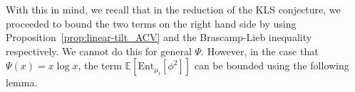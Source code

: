 
With this in mind, we recall that in the reduction of the KLS conjecture, we proceeded to bound the two terms on the 
right hand side by using Proposition~\ref{prop:linear-tilt_ACV} and the Brascamp-Lieb inequality respectively. 
We cannot do this for general \(\Psi\). However, in the case that \(\Psi(x) = x\log x\), 
the term \(\mathbb{E}[\text{Ent}_{\mu_t}[\phi^2]]\) can be bounded using the following lemma.

